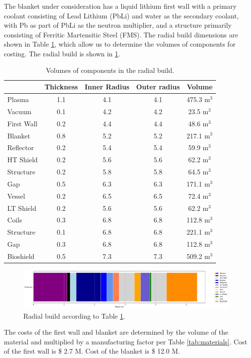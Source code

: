 The blanket under consideration has a liquid lithium first wall with a primary coolant consisting of Lead Lithium (PbLi) and water as the secondary coolant, with Pb as part of PbLi as the neutron multiplier, and a structure primarily consisting of Ferritic Martensitic Steel (FMS). The radial build dimensions are shown in Table \ref{tab:volumes}, which allow us to determine the volumes of components for costing.  The radial build is shown in \ref{fig:radial}.  \\


\begin{table}[h!]
    \centering
    \begin{tabular}{l c  c c c}
    \hline
        &	Thickness	&	Inner Radius	&	Outer radius	&	Volume		\\
        \hline
Plasma	&	1.1	&	4.1	&	4.1	&	475.3	m$^{3}$	\\
Vacuum	&	0.1	&	4.2	&	4.2	&	23.5	m$^{3}$	\\
First Wall	&	0.2	&	4.4	&	4.4	&	48.6	m$^{3}$	\\
Blanket	&	0.8	&	5.2	&	5.2	&	217.1	m$^{3}$	\\
Reflector	&	0.2	&	5.4	&	5.4	&	59.9	m$^{3}$	\\
HT Shield	&	0.2	&	5.6	&	5.6	&	62.2	m$^{3}$	\\
Structure	&	0.2	&	5.8	&	5.8	&	64.5	m$^{3}$	\\
Gap	&	0.5	&	6.3	&	6.3	&	171.1	m$^{3}$	\\
Vessel	&	0.2	&	6.5	&	6.5	&	72.4	m$^{3}$	\\
LT Shield	&	0.2	&	5.6	&	5.6	&	62.2	m$^{3}$	\\
Coils	&	0.3	&	6.8	&	6.8	&	112.8	m$^{3}$	\\
Structure	&	0.1	&	6.8	&	6.8	&	221.1	m$^{3}$	\\
Gap	&	0.3	&	6.8	&	6.8	&	112.8	m$^{3}$	\\
Bioshield	&	0.5	&	7.3	&	7.3	&	509.2	m$^{3}$	\\

        \hline
    \end{tabular}
    \caption{Volumes of components in the radial build.}
    \label{tab:volumes}
\end{table}

\begin{figure}
    \centering
    \includegraphics[width=0.9\linewidth]{Figures/radial_build.pdf}
    \caption{Radial build according to Table \ref{tab:volumes}.}
    \label{fig:radial}
\end{figure}



The costs of the first wall and blanket are determined by the volume of the material and multiplied by a manufacturing factor per Table \ref{tab:materials}.   Cost of the first wall is \$ 2.7 M.  Cost of the blanket is \$ 12.0 M.


